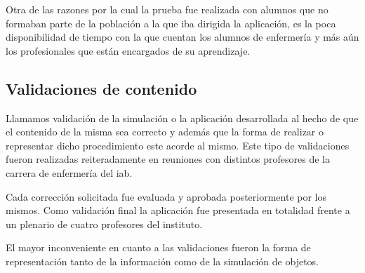 Otra de las razones por la cual la prueba fue realizada con alumnos que no
formaban parte de la población a la que iba dirigida la aplicación, es la poca
disponibilidad de tiempo con la que cuentan los alumnos de enfermería y más aún
los profesionales que están encargados de su aprendizaje.

\subsection{Validaciones de contenido}

Llamamos validación de la simulación o la aplicación desarrollada al hecho de
que el contenido de la misma sea correcto y además que la forma de realizar o
representar dicho procedimiento este acorde al mismo. Este tipo de validaciones
fueron realizadas reiteradamente en reuniones con distintos profesores de la
carrera de enfermería del \Gls{iab}.

Cada corrección solicitada fue evaluada y aprobada posteriormente por los
mismos. Como validación final la aplicación fue presentada en totalidad frente a
un plenario de cuatro profesores del instituto.

El mayor inconveniente en cuanto a las validaciones fueron la forma de
representación tanto de la información como de la simulación de objetos.
